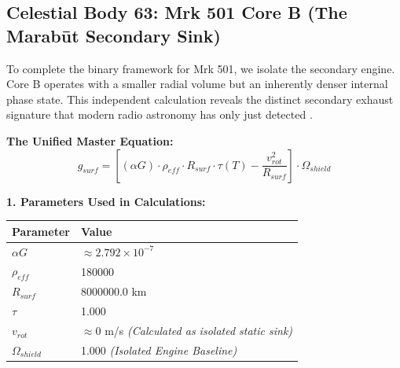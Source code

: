 \documentclass[11pt, a4paper]{article}
\begin{document}
\clearpage
\subsection{Celestial Body 63: Mrk 501 Core B (The Marab\={u}t Secondary Sink)}
  To complete the binary framework for Mrk 501, we isolate the secondary engine. Core B operates with a smaller radial volume but an inherently denser internal phase state. This independent calculation reveals the distinct secondary exhaust signature that modern radio astronomy has only just detected \cite{mrk501_2026}. 

  \vspace{0.5em}
  \noindent \textbf{The Unified Master Equation:}
  $$ g_{surf} = \left[ (\alpha G) \cdot \rho_{eff} \cdot R_{surf} \cdot \tau(T) - \frac{v_{rot}^2}{R_{surf}} \right] \cdot \Omega_{shield} $$

  \vspace{0.5em}
  \noindent \textbf{1. Parameters Used in Calculations:} \\[0.5em]
  \begingroup
  \renewcommand{\arraystretch}{1.3}
  \hspace*{2em}
  \begin{tabular}{|l|l|}
    \hline
    \textbf{Parameter} & \textbf{Value} \\ \hline
    $\alpha G$ & $\approx 2.792 \times 10^{-7}$ \\ \hline
    $\rho_{eff}$ & 180000 \\ \hline
    $R_{surf}$ & 8000000.0 km \\ \hline
    $\tau$ & 1.000 \\ \hline
    $v_{rot}$ & $\approx 0$ m/s \textit{(Calculated as isolated static sink)} \\ \hline
    $\Omega_{shield}$ & 1.000 \textit{(Isolated Engine Baseline)} \\ \hline
  \end{tabular}
  \endgroup
\end{document}
